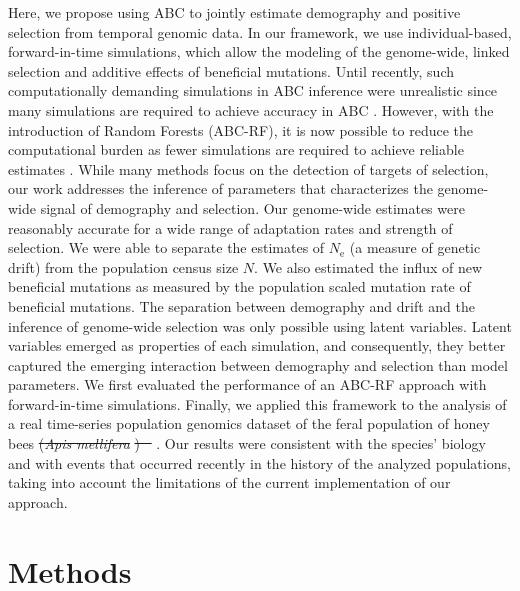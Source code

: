 \documentclass[a4paper, 12pt]{article}
\providecommand{\DIFaddtex}[1]{{\protect\color{blue}\uwave{#1}}} %
\providecommand{\DIFdeltex}[1]{{\protect\color{red}\sout{#1}}}                      %
\providecommand{\DIFaddbegin}{} %
\providecommand{\DIFaddend}{} %
\providecommand{\DIFdelbegin}{} %
\providecommand{\DIFdelend}{} %
\providecommand{\DIFadd}[1]{\texorpdfstring{\DIFaddtex{#1}}{#1}} %
\providecommand{\DIFdel}[1]{\texorpdfstring{\DIFdeltex{#1}}{}} %
\newcommand{\DIFscaledelfig}{0.5}
\newlength{\DIFdelgraphicswidth} %
\newlength{\DIFdelgraphicsheight} %
\newcommand{\DIFaddincludegraphics}[2][]{{\color{blue}\fbox{\DIFOincludegraphics[#1]{#2}}}} %
\newcommand{\DIFdelincludegraphics}[2][]{%
\sbox{\DIFdelgraphicsbox}{\DIFOincludegraphics[#1]{#2}}%
\settoboxwidth{\DIFdelgraphicswidth}{\DIFdelgraphicsbox} %
\settoboxtotalheight{\DIFdelgraphicsheight}{\DIFdelgraphicsbox} %
\scalebox{\DIFscaledelfig}{%
\parbox[b]{\DIFdelgraphicswidth}{\usebox{\DIFdelgraphicsbox}\\[-\baselineskip] \rule{\DIFdelgraphicswidth}{0em}}\llap{\resizebox{\DIFdelgraphicswidth}{\DIFdelgraphicsheight}{%
\setlength{\unitlength}{\DIFdelgraphicswidth}%
\begin{picture}(1,1)%
\thicklines\linethickness{2pt} %
{\color[rgb]{1,0,0}\put(0,0){\framebox(1,1){}}}%
{\color[rgb]{1,0,0}\put(0,0){\line( 1,1){1}}}%
{\color[rgb]{1,0,0}\put(0,1){\line(1,-1){1}}}%
\end{picture}%
}\hspace*{3pt}}} %
} %
\DeclareRobustCommand{\DIFaddbegin}{\DIFOaddbegin \let\includegraphics\DIFaddincludegraphics} %
\DeclareRobustCommand{\DIFaddend}{\DIFOaddend \let\includegraphics\DIFOincludegraphics} %
\DeclareRobustCommand{\DIFdelbegin}{\DIFOdelbegin \let\includegraphics\DIFdelincludegraphics} %
\DeclareRobustCommand{\DIFdelend}{\DIFOaddend \let\includegraphics\DIFOincludegraphics} %
\begin{document}
Here, we propose using ABC to jointly estimate demography and positive selection from temporal genomic data. In our framework, we use individual-based, forward-in-time simulations, which allow the modeling of the genome-wide, linked selection and additive effects of beneficial mutations. Until recently, such computationally demanding simulations in ABC inference were unrealistic since many simulations are required to achieve accuracy in ABC \citep{Frazier:2018kq}. However, with the introduction of Random Forests (ABC-RF), it is now possible to reduce the computational burden as fewer simulations are required to achieve reliable estimates \citep{Pudlo:2016il, Raynal:2019jj}. While many methods focus on the detection of targets of selection, our work addresses the inference of parameters that characterizes the genome-wide signal of demography and selection. Our genome-wide estimates were reasonably accurate for a wide range of adaptation rates and strength of selection. We were able to separate the estimates of $N_{\mathrm{e}}$ (a measure of genetic drift) from the population census size $N$. We also estimated the influx of new beneficial mutations as measured by the population scaled mutation rate of beneficial mutations. The separation between demography and drift and the inference of genome-wide selection was only possible using latent variables. Latent variables emerged as properties of each simulation, and consequently, they better captured the emerging interaction between demography and selection than model parameters. We first evaluated the performance of an ABC-RF approach with forward-in-time simulations. Finally, we applied this framework to the analysis of a real time-series population genomics dataset of the feral population of honey bees \DIFdelbegin \DIFdel{(}\textit{\DIFdel{Apis mellifera}}%
\DIFdel{) \mbox{%
\citep{Cridland:2018fx}}\hspace{0pt}%
}\DIFdelend \DIFaddbegin \DIFadd{\mbox{%
\citep[\textit{Apis mellifera},][]{Cridland:2018fx}}\hspace{0pt}%
}\DIFaddend . Our results were consistent with the species' biology and with events that occurred recently in the history of the analyzed populations, taking into account the limitations of the current implementation of our approach.

\section*{Methods}
\end{document}
